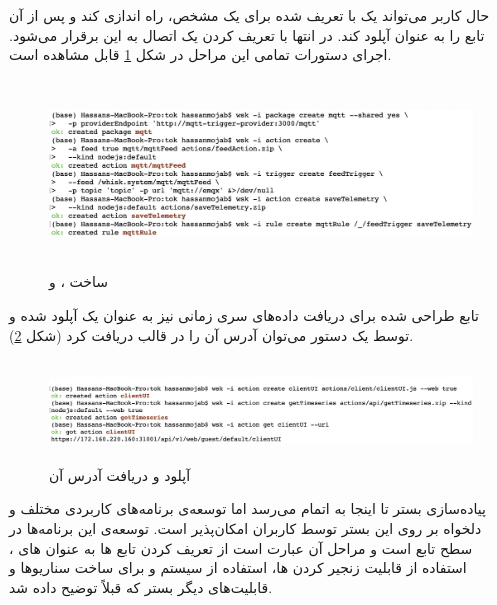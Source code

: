 حال کاربر می‌تواند یک  با  تعریف شده برای یک  مشخص، راه اندازی کند و پس از آن تابع  را به عنوان  آپلود کند. در انتها با تعریف کردن یک  اتصال  به این  برقرار می‌شود. اجرای دستورات تمامی این مراحل در شکل \ref{wsk} قابل مشاهده است.

\begin{figure}[!h]
	\centering
	\includegraphics[height=5cm]{images/wsk}
	\caption{ساخت ،  و }
	\label{wsk}
\end{figure}

تابع طراحی شده برای دریافت داده‌های سری زمانی نیز به عنوان یک  آپلود شده و توسط یک دستور  می‌توان آدرس آن را در قالب  دریافت کرد (شکل \ref{wsk-action}).

\begin{figure}[!h]
	\centering
	\includegraphics[height=2.7cm]{images/wsk-action}
	\caption{آپلود  و دریافت آدرس آن}
	\label{wsk-action}
\end{figure}

پیاده‌سازی بستر تا اینجا به اتمام می‌رسد اما توسعه‌ی برنامه‌های کاربردی مختلف و دلخواه بر روی این بستر توسط کاربران امکان‌پذیر است. توسعه‌ی این برنامه‌ها در سطح تابع است و مراحل آن عبارت است از تعریف کردن تابع ها به عنوان  های ، استفاده از قابلیت زنجیر کردن  ها، استفاده از سیستم  و  برای ساخت سناریوها و قابلیت‌های دیگر بستر که قبلاً توضیح داده شد.
